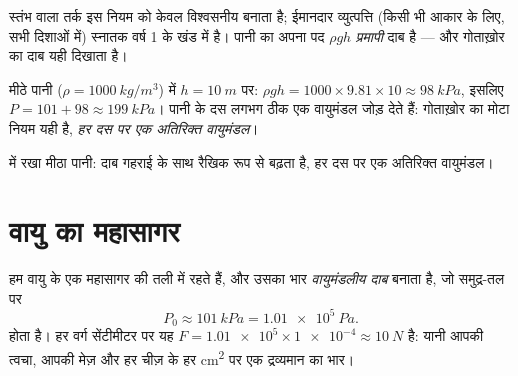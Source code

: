 \begin{remark}
स्तंभ वाला तर्क इस नियम को केवल विश्वसनीय बनाता है; ईमानदार व्युत्पत्ति
(किसी भी आकार के लिए, सभी दिशाओं में) स्नातक वर्ष 1 के खंड में है। पानी
का अपना पद $\rho g h$ \emph{प्रमापी} दाब है ---
और गोताख़ोर का दाब  यही दिखाता है।
\end{remark}

\begin{example}[पानी के दस मीटर]\label{ex:g10:pressure:tenmetres}
मीठे पानी ($\rho = \qty{1000}{kg/m^3}$) में $h = \qty{10}{m}$ पर: $\rho g h = 1000 \times 9.81 \times 10 \approx \qty{98}{kPa}$, इसलिए $P = 101 + 98 \approx \qty{199}{kPa}$। पानी के दस
 लगभग ठीक एक वायुमंडल जोड़ देते हैं: गोताख़ोर का मोटा नियम
यही है, \emph{हर दस  पर एक अतिरिक्त वायुमंडल}।
\end{example}

\begin{omfigure}

{\small {} में रखा मीठा पानी: दाब गहराई के साथ रैखिक रूप से
बढ़ता है, हर दस  पर एक अतिरिक्त वायुमंडल।}
\end{omfigure}

\section{वायु का महासागर}

\begin{definition}[वायुमंडलीय दाब]\label{def:g10:pressure:atmospheric}
हम वायु के एक महासागर की तली में रहते हैं, और उसका भार
\emph{वायुमंडलीय दाब} बनाता है, जो समुद्र-तल पर
\[
P_0 \approx \qty{101}{kPa} = \qty{1.01e5}{Pa}.
\]
होता है। हर वर्ग सेंटीमीटर पर यह $F = \num{1.01e5} \times \num{1e-4}
\approx \qty{10}{N}$ है: यानी आपकी त्वचा, आपकी मेज़
और हर चीज़ के हर \unit{cm^2} पर एक  द्रव्यमान का
भार।
\end{definition}

